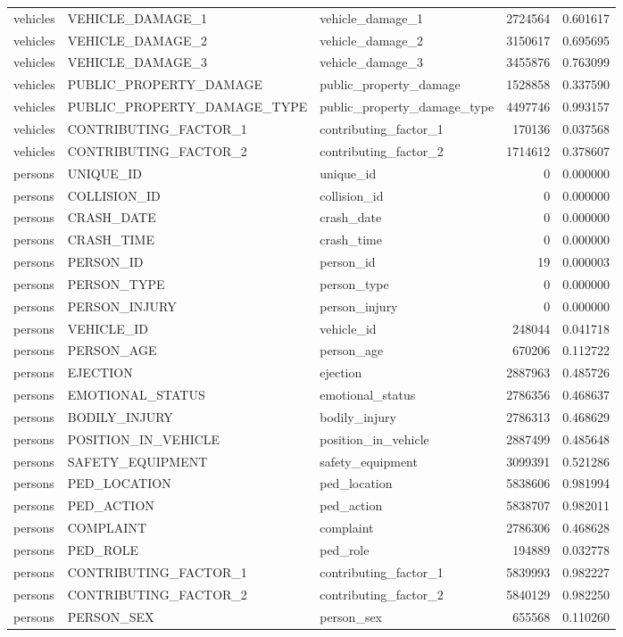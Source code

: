 \begin{tabular}{lllrr}
vehicles & VEHICLE_DAMAGE_1 & vehicle_damage_1 & 2724564 & 0.601617 \\
vehicles & VEHICLE_DAMAGE_2 & vehicle_damage_2 & 3150617 & 0.695695 \\
vehicles & VEHICLE_DAMAGE_3 & vehicle_damage_3 & 3455876 & 0.763099 \\
vehicles & PUBLIC_PROPERTY_DAMAGE & public_property_damage & 1528858 & 0.337590 \\
vehicles & PUBLIC_PROPERTY_DAMAGE_TYPE & public_property_damage_type & 4497746 & 0.993157 \\
vehicles & CONTRIBUTING_FACTOR_1 & contributing_factor_1 & 170136 & 0.037568 \\
vehicles & CONTRIBUTING_FACTOR_2 & contributing_factor_2 & 1714612 & 0.378607 \\
persons & UNIQUE_ID & unique_id & 0 & 0.000000 \\
persons & COLLISION_ID & collision_id & 0 & 0.000000 \\
persons & CRASH_DATE & crash_date & 0 & 0.000000 \\
persons & CRASH_TIME & crash_time & 0 & 0.000000 \\
persons & PERSON_ID & person_id & 19 & 0.000003 \\
persons & PERSON_TYPE & person_type & 0 & 0.000000 \\
persons & PERSON_INJURY & person_injury & 0 & 0.000000 \\
persons & VEHICLE_ID & vehicle_id & 248044 & 0.041718 \\
persons & PERSON_AGE & person_age & 670206 & 0.112722 \\
persons & EJECTION & ejection & 2887963 & 0.485726 \\
persons & EMOTIONAL_STATUS & emotional_status & 2786356 & 0.468637 \\
persons & BODILY_INJURY & bodily_injury & 2786313 & 0.468629 \\
persons & POSITION_IN_VEHICLE & position_in_vehicle & 2887499 & 0.485648 \\
persons & SAFETY_EQUIPMENT & safety_equipment & 3099391 & 0.521286 \\
persons & PED_LOCATION & ped_location & 5838606 & 0.981994 \\
persons & PED_ACTION & ped_action & 5838707 & 0.982011 \\
persons & COMPLAINT & complaint & 2786306 & 0.468628 \\
persons & PED_ROLE & ped_role & 194889 & 0.032778 \\
persons & CONTRIBUTING_FACTOR_1 & contributing_factor_1 & 5839993 & 0.982227 \\
persons & CONTRIBUTING_FACTOR_2 & contributing_factor_2 & 5840129 & 0.982250 \\
persons & PERSON_SEX & person_sex & 655568 & 0.110260 \\
\bottomrule
\end{tabular}
